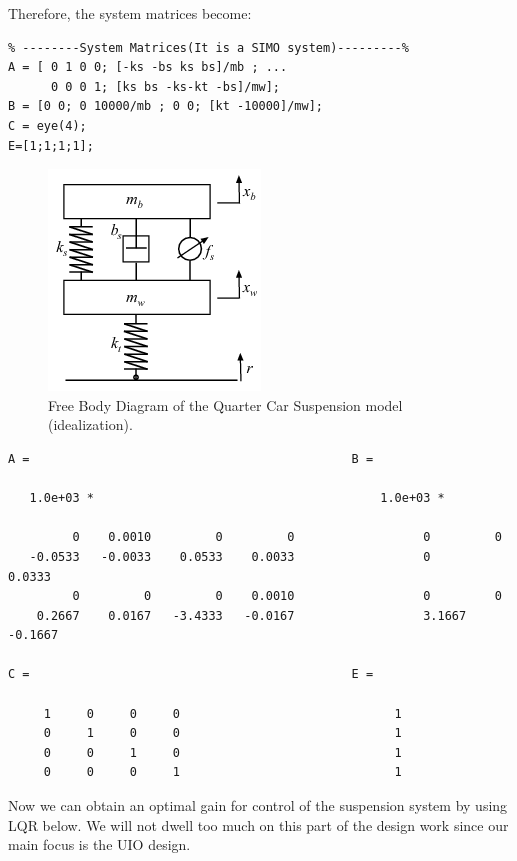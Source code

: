 \documentclass{amsart}
\theoremstyle{definition}
\theoremstyle{remark}
\numberwithin{equation}{section}
\begin{document}
Therefore, the system matrices become:

\begin{verbatim}
% --------System Matrices(It is a SIMO system)---------%
A = [ 0 1 0 0; [-ks -bs ks bs]/mb ; ...
      0 0 0 1; [ks bs -ks-kt -bs]/mw];
B = [0 0; 0 10000/mb ; 0 0; [kt -10000]/mw];
C = eye(4);
E=[1;1;1;1];
\end{verbatim}

\begin{figure}[H]
    \centering
    \includegraphics[scale=.9]{qcarsus.png}
    \caption{Free Body Diagram of the Quarter Car Suspension model (idealization).}
    \label{fig:car_sus_fbd}
\end{figure}

\color{lightgray} \begin{verbatim}
A =                                             B =

   1.0e+03 *                                        1.0e+03 *

         0    0.0010         0         0                  0         0
   -0.0533   -0.0033    0.0533    0.0033                  0         0.0333
         0         0         0    0.0010                  0         0
    0.2667    0.0167   -3.4333   -0.0167                  3.1667   -0.1667

C =                                             E =

     1     0     0     0                              1
     0     1     0     0                              1
     0     0     1     0                              1
     0     0     0     1                              1

\end{verbatim} \color{black}
Now we can obtain an optimal gain for control of the suspension system by using LQR below.  We will not dwell too much on this part of the design work since our main focus is the UIO design.
\end{document}
